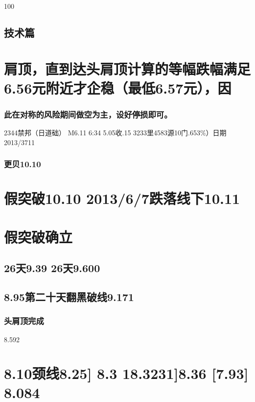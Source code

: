 \documentclass{article}
\begin{document}
100

\clearpage

\subsection{技术篇}

\section{肩顶，直到达头肩顶计算的等幅跌幅满足6.56元附近才企稳（最低6.57元），因}

\subsubsection{此在对称的风险期间做空为主，设好停损即可。}

2344禁邦（日道础） M6.11 6:34 5.05收.15 3233里4583源10门.653\%）日期2013/3711

\subsubsection{更贝10.10}

\section{假突破10.10 2013/6/7跌落线下10.11}

\section{假突破确立}

\subsection{26天9.39 26天9.600}

\subsection{8.95第二十天翻黑破线9.171}

\subsubsection{头肩顶完成}

8.592

\section{8.10颈线8.25] 8.3 18.3231]8.36 [7.93] 8.084}
\end{document}
